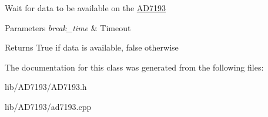 Wait for data to be available on the \hyperlink{classAD7193}{A\+D7193} 
\begin{DoxyParams}{Parameters}
{\em break\+\_\+time} & Timeout \\
\hline
\end{DoxyParams}
\begin{DoxyReturn}{Returns}
True if data is available, false otherwise 
\end{DoxyReturn}


The documentation for this class was generated from the following files\+:\begin{DoxyCompactItemize}
\item 
lib/\+A\+D7193/A\+D7193.\+h\item 
lib/\+A\+D7193/ad7193.\+cpp\end{DoxyCompactItemize}
